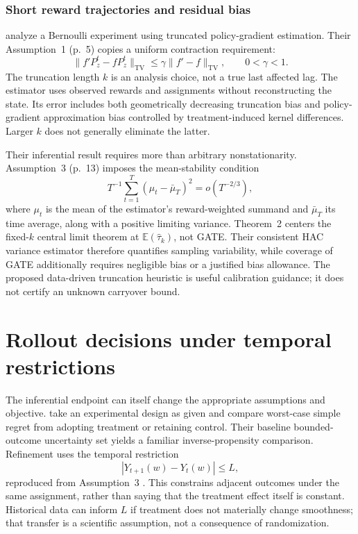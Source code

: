 \documentclass[12pt]{article}
\begin{document}
\subsubsection{Short reward trajectories and residual bias}

\citet{johari2025} analyze a Bernoulli experiment using truncated policy-gradient estimation. Their Assumption~1 (p.~5) copies a uniform contraction requirement:
\begin{equation}
 \lVert f'P_z^t-fP_z^t\rVert_{\mathrm{TV}}
 \leq\gamma\lVert f'-f\rVert_{\mathrm{TV}},\qquad0<\gamma<1.
\end{equation}
The truncation length $k$ is an analysis choice, not a true last affected lag. The estimator uses observed rewards and assignments without reconstructing the state. Its error includes both geometrically decreasing truncation bias and policy-gradient approximation bias controlled by treatment-induced kernel differences. Larger $k$ does not generally eliminate the latter.

Their inferential result requires more than arbitrary nonstationarity. Assumption~3 (p.~13) imposes the mean-stability condition
\begin{equation}
 T^{-1}\sum_{t=1}^{T}(\mu_t-\bar\mu_T)^2=o(T^{-2/3}),
\end{equation}
where $\mu_t$ is the mean of the estimator's reward-weighted summand and $\bar\mu_T$ its time average, along with a positive limiting variance. Theorem~2 centers the fixed-$k$ central limit theorem at $\mathbb{E}(\widehat\tau_k)$, not GATE. Their consistent HAC variance estimator therefore quantifies sampling variability, while coverage of GATE additionally requires negligible bias or a justified bias allowance. The proposed data-driven truncation heuristic is useful calibration guidance; it does not certify an unknown carryover bound.




\section{Rollout decisions under temporal restrictions}\label{sec:decisions}

The inferential endpoint can itself change the appropriate assumptions and objective. \citet{ni2025decision} take an experimental design as given and compare worst-case simple regret from adopting treatment or retaining control. Their baseline bounded-outcome uncertainty set yields a familiar inverse-propensity comparison. Refinement uses the temporal restriction
\begin{equation}\label{eq:decision-smoothness}
 |Y_{t+1}(w)-Y_t(w)|\leq L,
\end{equation}
reproduced from Assumption~3 \citep[Eq.~(10), p.~10]{ni2025decision}. This constrains adjacent outcomes under the same assignment, rather than saying that the treatment effect itself is constant. Historical data can inform $L$ if treatment does not materially change smoothness; that transfer is a scientific assumption, not a consequence of randomization.
\end{document}
